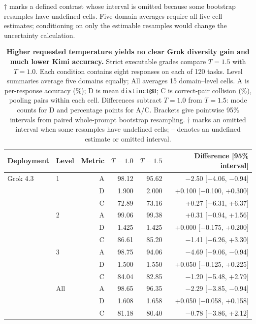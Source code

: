 $\dagger$ marks a defined contrast whose interval is omitted because some
bootstrap resamples have undefined cells. Five-domain averages require all
five cell estimates; conditioning on only the estimable resamples would
change the uncertainty calculation.

\begin{table}[!htbp]
  \centering
  \setlength{\parfillskip}{0pt plus .20\linewidth}
  \caption{\textbf{Higher requested temperature yields no clear Grok diversity gain and much lower Kimi accuracy.} Strict executable grades compare $T=1.5$ with $T=1.0$.
  Each condition contains eight responses on each of 120 tasks.
  Level summaries average five domains equally; All averages 15 domain--level cells.
  A is per-response accuracy (\%); D is mean \texttt{distinct@8};
  C is correct-pair collision (\%), pooling pairs within each cell.
  Differences subtract $T=1.0$ from $T=1.5$: mode counts for D and percentage points for A/C.
  Brackets give pointwise 95\% intervals from paired whole-prompt bootstrap resampling.
  $\dagger$ marks an omitted interval when some resamples have undefined cells;
  -- denotes an undefined estimate or omitted interval.}
  \small
  \setlength{\tabcolsep}{5pt}
  \begin{tabular}{@{}llrrrr@{}}
    \toprule
    Deployment & Level & Metric & $T=1.0$ & $T=1.5$ & Difference [95\% interval] \\
    \midrule
    Grok 4.3 & 1 & A & 98.12 & 95.62 & $-$2.50 [$-$4.06, $-$0.94] \\
     &  & D & 1.900 & 2.000 & +0.100 [$-$0.100, +0.300] \\
     &  & C & 72.89 & 73.16 & +0.27 [$-$6.31, +6.37] \\
     & 2 & A & 99.06 & 99.38 & +0.31 [$-$0.94, +1.56] \\
     &  & D & 1.425 & 1.425 & +0.000 [$-$0.175, +0.200] \\
     &  & C & 86.61 & 85.20 & $-$1.41 [$-$6.26, +3.30] \\
     & 3 & A & 98.75 & 94.06 & $-$4.69 [$-$9.06, $-$0.94] \\
     &  & D & 1.500 & 1.550 & +0.050 [$-$0.125, +0.225] \\
     &  & C & 84.04 & 82.85 & $-$1.20 [$-$5.48, +2.79] \\
     & All & A & 98.65 & 96.35 & $-$2.29 [$-$3.85, $-$0.94] \\
     &  & D & 1.608 & 1.658 & +0.050 [$-$0.058, +0.158] \\
     &  & C & 81.18 & 80.40 & $-$0.78 [$-$3.86, +2.12] \\

\end{tabular}
\end{table}

